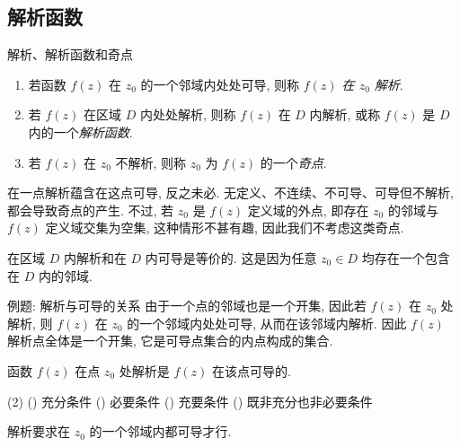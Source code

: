 \subsection{解析函数}


\begin{frame}{解析、解析函数和奇点}
	\onslide<+->
	\begin{definition}
		\begin{enumerate}
			\item 若函数 $f(z)$ 在 $z_0$ 的一个邻域内处处可导, 则称 \emph{$f(z)$ 在 $z_0$ 解析}.
			\item 若 $f(z)$ 在区域 $D$ 内处处解析, 则称 $f(z)$ 在 $D$ 内解析, 或称 $f(z)$ 是 $D$ 内的一个\emph{解析函数}.
			\item 若 $f(z)$ 在 $z_0$ 不解析, 则称 $z_0$ 为 $f(z)$ 的一个\emph{奇点}.
		\end{enumerate}
	\end{definition}
	\onslide<+->
	\alert{在一点解析蕴含在这点可导, 反之未必.} 
	\onslide<+->
	无定义、不连续、不可导、可导但不解析, 都会导致奇点的产生.
	\onslide<+->
	不过, 若 $z_0$ 是 $f(z)$ 定义域的外点, 即存在 $z_0$ 的邻域与 $f(z)$ 定义域交集为空集, 这种情形不甚有趣, 因此我们不考虑这类奇点.

	\onslide<+->
	\alert{在区域 $D$ 内解析和在 $D$ 内可导是等价的.} 
	\onslide<+->
	这是因为任意 $z_0\in D$ 均存在一个包含在 $D$ 内的邻域.
\end{frame}


\begin{frame}{例题: 解析与可导的关系}
	\onslide<+->
	由于一个点的邻域也是一个开集, 因此若 $f(z)$ 在 $z_0$ 处解析, 则 $f(z)$ 在 $z_0$ 的一个邻域内处处可导, 从而在该邻域内解析. 
	\onslide<+->
	因此 \alert{$f(z)$ 解析点全体是一个开集}, 它是可导点集合的内点构成的集合.
	\onslide<+->
	\begin{exercise}[nearnext]
		函数 $f(z)$ 在点 $z_0$ 处解析是 $f(z)$ 在该点可导的.
		\begin{exchoice}(2)
			() 充分条件
			() 必要条件
			() 充要条件
			() 既非充分也非必要条件
		\end{exchoice}
	\end{exercise}
	\onslide<+->
	\begin{answer}[nearprev]
		解析要求在 $z_0$ 的一个邻域内都可导才行.
	\end{answer}
\end{frame}


